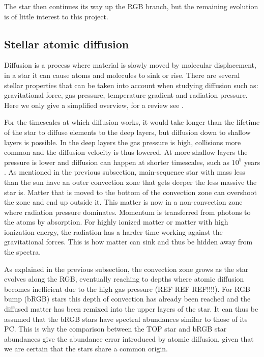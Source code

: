\documentclass[twocolumn]{aastex62}
\begin{document}
The star then continues its way up the RGB branch, but the remaining evolution is of little interest to this project.

\subsection{Stellar atomic diffusion}
\label{sec:theory_atomic_diffusion}
Diffusion is a process where material is slowly moved by molecular displacement, in a star it can cause atoms and molecules to sink or rise. There are several stellar properties that can be taken into account when studying diffusion such as: gravitational force, gas pressure, temperature gradient and radiation pressure. Here we only give a simplified overview, for a review see \cite{Vauclair}.

For the timescales at which diffusion works, it would take longer than the lifetime of the star to diffuse elements to the deep layers, but diffusion down to shallow layers is possible. In the deep layers the gas pressure is high, collisions more common and the diffusion velocity is thus lowered. At more shallow layers the pressure is lower and diffusion can happen at shorter timescales, such as $10^5$ years \citep{BV1_pp136_140}. As mentioned in the previous subsection, main-sequence star with mass less than the sun have an outer convection zone that gets deeper the less massive the star is. Matter that is moved to the bottom of the convection zone can overshoot the zone and end up outside it. This matter is now in a non-convection zone where radiation pressure dominates. Momentum is transferred from photons to the atoms by absorption. For highly ionized matter or matter with high ionization energy, the radiation has a harder time working against the gravitational forces. This is how matter can sink and thus be hidden away from the spectra.

As explained in the previous subsection, the convection zone grows as the star evolves along the RGB, eventually reaching to depths where atomic diffusion becomes inefficient due to the high gas pressure (REF REF REF!!!!). For RGB bump (bRGB) stars this depth of convection has already been reached and the diffused matter has been remixed into the upper layers of the star. It can thus be assumed that the bRGB stars have spectral abundances similar to those of its PC. This is why the comparison between the TOP star and bRGB star abundances give the abundance error introduced by atomic diffusion, given that we are certain that the stars share a common origin.
\end{document}
